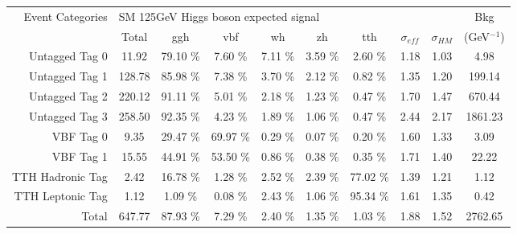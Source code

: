 \begin{tabular}{ |r | c | c | c  | c |  c |  c |  c |  c |  c | }
\hline
\multirow{2}{*}{Event Categories} &\multicolumn{8}{|l|}{SM 125GeV Higgs boson expected signal} & Bkg \\ \cline{2-9}
  &  Total & ggh & vbf & wh & zh & tth &   $\sigma_{eff} $  & $\sigma_{HM} $ & (GeV$^{-1}$) \\
  \hline
  Untagged Tag 0 &    11.92  &  79.10 \% &  7.60 \% &  7.11 \% &  3.59 \% &  2.60 \%& 1.18 & 1.03 & 4.98 \\
  Untagged Tag 1 &    128.78  &  85.98 \% &  7.38 \% &  3.70 \% &  2.12 \% &  0.82 \%& 1.35 & 1.20 & 199.14 \\
  Untagged Tag 2 &    220.12  &  91.11 \% &  5.01 \% &  2.18 \% &  1.23 \% &  0.47 \%& 1.70 & 1.47 & 670.44 \\
  Untagged Tag 3 &    258.50  &  92.35 \% &  4.23 \% &  1.89 \% &  1.06 \% &  0.47 \%& 2.44 & 2.17 & 1861.23 \\
  VBF Tag 0 &    9.35  &  29.47 \% &  69.97 \% &  0.29 \% &  0.07 \% &  0.20 \%& 1.60 & 1.33 & 3.09 \\
  VBF Tag 1 &    15.55  &  44.91 \% &  53.50 \% &  0.86 \% &  0.38 \% &  0.35 \%& 1.71 & 1.40 & 22.22 \\
  TTH Hadronic Tag &    2.42  &  16.78 \% &  1.28 \% &  2.52 \% &  2.39 \% &  77.02 \%& 1.39 & 1.21 & 1.12 \\
  TTH Leptonic Tag &    1.12  &  1.09 \% &  0.08 \% &  2.43 \% &  1.06 \% &  95.34 \%& 1.61 & 1.35 & 0.42 \\
  Total &    647.77  &  87.93 \% &  7.29 \% &  2.40 \% &  1.35 \% &  1.03 \%& 1.88 & 1.52 & 2762.65 \\
  \hline
  \end{tabular}
